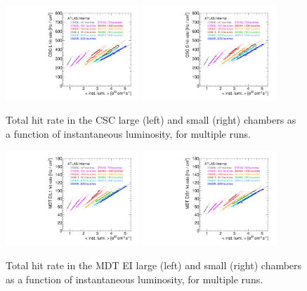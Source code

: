 \begin{figure}
  \begin{center}
    \includegraphics[width=0.45\textwidth]{./figures/rate_raw_vs_lumi_vs_evts_csc_CSL1_overlay.pdf}
    \includegraphics[width=0.45\textwidth]{./figures/rate_raw_vs_lumi_vs_evts_csc_CSS1_overlay.pdf}
    \caption{Total hit rate in the CSC large (left) and small (right) chambers as a function of instantaneous luminosity, for multiple runs.}
    \label{fig:hitrates-vs-lumi-csc-raw}
  \end{center}
\end{figure}

\begin{figure}
  \begin{center}
    \includegraphics[width=0.45\textwidth]{./figures/rate_raw_vs_lumi_vs_evts_mdt_EIL1_overlay.pdf}
    \includegraphics[width=0.45\textwidth]{./figures/rate_raw_vs_lumi_vs_evts_mdt_EIS1_overlay.pdf}
    \caption{Total hit rate in the MDT EI large (left) and small (right) chambers as a function of instantaneous luminosity, for multiple runs.}
    \label{fig:hitrates-vs-lumi-mdt-ei1-raw}
  \end{center}
\end{figure}

